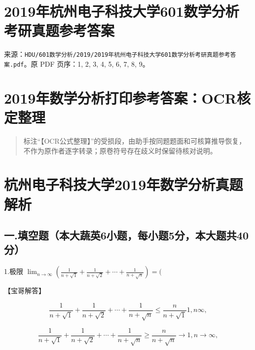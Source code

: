 \documentclass[11pt,fontset=fandol]{ctexart}
\begin{document}
\section{2019年杭州电子科技大学601数学分析考研真题参考答案}\label{ux5e74ux676dux5ddeux7535ux5b50ux79d1ux6280ux5927ux5b66601ux6570ux5b66ux5206ux6790ux8003ux7814ux771fux9898ux53c2ux8003ux7b54ux6848}

来源：\texttt{HDU/601数学分析/2019/2019年杭州电子科技大学601数学分析考研真题参考答案.pdf}。原
PDF 页序：1, 2, 3, 4, 5, 6, 7, 8, 9。

\section{2019年数学分析打印参考答案：OCR核定整理}\label{ux5e74ux6570ux5b66ux5206ux6790ux6253ux5370ux53c2ux8003ux7b54ux6848ocrux6838ux5b9aux6574ux7406}

\begin{quote}
标注``【OCR公式整理】''的受损段，由助手按同题题面和可核算推导恢复，不作为原作者逐字转录；原卷符号存在歧义时保留待核对说明。
\end{quote}

\section{杭州电子科技大学2019年数学分析真题解析}\label{ux676dux5ddeux7535ux5b50ux79d1ux6280ux5927ux5b662019ux5e74ux6570ux5b66ux5206ux6790ux771fux9898ux89e3ux6790}

\subsection{一.填空题（本大蔬英6小题，每小题5分，本大题共40分）}\label{ux4e00.ux586bux7a7aux9898ux672cux5927ux852cux82f16ux5c0fux9898ux6bcfux5c0fux98985ux5206ux672cux5927ux9898ux517140ux5206}

1.极限
\(\lim _ { n \to \infty } ( { \frac { 1 } { n + { \sqrt { 1 } } } } + { \frac { 1 } { n + { \sqrt { 2 } } } } + \cdots + { \frac { 1 } { n + { \sqrt { n } } } } ) = (\)

【宝哥解答】

\[
\frac { 1 } { n + \sqrt { 1 } } + \frac { 1 } { n + \sqrt { 2 } } + \cdots + \frac { 1 } { n + \sqrt { n } } \leq \frac { n } { n + \sqrt { 1 } }  1 , n  \infty ,
\]

\[
{ \frac { 1 } { n + { \sqrt { 1 } } } } + { \frac { 1 } { n + { \sqrt { 2 } } } } + \cdots + { \frac { 1 } { n + { \sqrt { n } } } } \geq { \frac { n } { n + { \sqrt { n } } } } \to 1 , n \to \infty ,
\]
\end{document}
